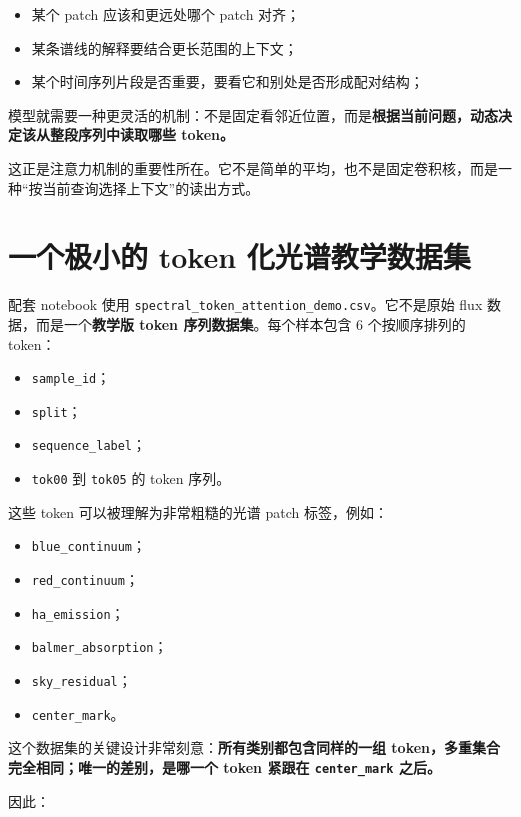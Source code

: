 \begin{itemize}
    \item 某个 patch 应该和更远处哪个 patch 对齐；
    \item 某条谱线的解释要结合更长范围的上下文；
    \item 某个时间序列片段是否重要，要看它和别处是否形成配对结构；
\end{itemize}

模型就需要一种更灵活的机制：不是固定看邻近位置，而是\textbf{根据当前问题，动态决定该从整段序列中读取哪些 token。}

这正是注意力机制的重要性所在。它不是简单的平均，也不是固定卷积核，而是一种“按当前查询选择上下文”的读出方式。

\section{一个极小的 token 化光谱教学数据集}

配套 notebook 使用 \nolinkurl{spectral_token_attention_demo.csv}。它不是原始 flux 数据，而是一个\textbf{教学版 token 序列数据集}。每个样本包含 6 个按顺序排列的 token：

\begin{itemize}
    \item \texttt{sample\_id}；
    \item \texttt{split}；
    \item \texttt{sequence\_label}；
    \item \texttt{tok00} 到 \texttt{tok05} 的 token 序列。
\end{itemize}

这些 token 可以被理解为非常粗糙的光谱 patch 标签，例如：

\begin{itemize}
    \item \texttt{blue\_continuum}；
    \item \texttt{red\_continuum}；
    \item \texttt{ha\_emission}；
    \item \texttt{balmer\_absorption}；
    \item \texttt{sky\_residual}；
    \item \texttt{center\_mark}。
\end{itemize}

这个数据集的关键设计非常刻意：\textbf{所有类别都包含同样的一组 token，多重集合完全相同；唯一的差别，是哪一个 token 紧跟在 \texttt{center\_mark} 之后。}

因此：

